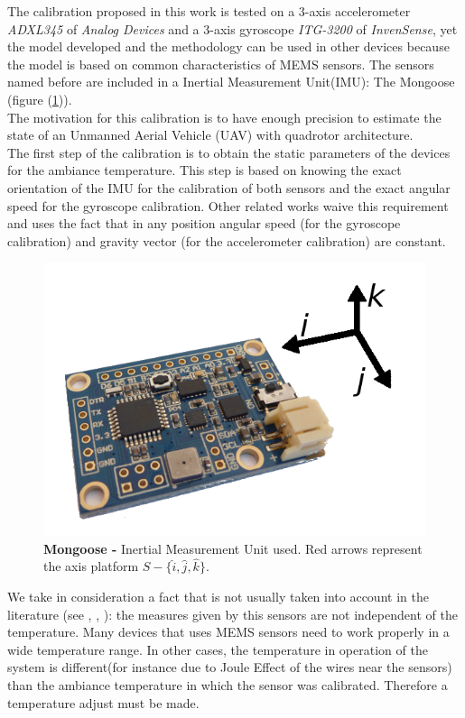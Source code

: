 \documentclass[conference]{IEEEtran}
\newcommand{\refp}[1]{(\ref{#1})}
\begin{document}
The calibration proposed in this work is tested on a 3-axis accelerometer \emph{ADXL345} of \emph{Analog Devices} and a 3-axis gyroscope \emph{ITG-3200} of \emph{InvenSense}, yet the model developed and the methodology can be used in other devices because the model is based on common characteristics of MEMS sensors. The sensors named before are included in a Inertial Measurement Unit(IMU): The Mongoose (figure \refp{fig:mongoose}). \\

The motivation for this calibration is to have enough precision to estimate the state of an Unmanned Aerial Vehicle (UAV) with quadrotor architecture.\\

The first step of the calibration is to obtain the static parameters of the devices for the ambiance temperature. This step is based on knowing the exact orientation of the IMU for the calibration of both sensors and the exact angular speed for the gyroscope calibration. Other related works waive this requirement\cite{bib:calib_imu, bib:kalman} and uses the fact that in any position angular speed (for the gyroscope calibration) and gravity vector (for the accelerometer calibration) are constant.\\

\begin{figure}[h]
	\centering
	\includegraphics[width=.6\columnwidth]{./pics_paper/mongoose.png}
	\caption{\textbf{Mongoose -} Inertial Measurement Unit used. Red arrows represent the axis platform $S - \{\hat{i}, \hat{j}, \hat{k} \}$. }
	\label{fig:mongoose}
\end{figure}

We take in consideration a fact that is not usually taken into account in the literature (see \cite{bib:calib_imu}, \cite{bib:kalman}, \cite{bib:calib_imu_dos}): the measures given by this sensors are not independent of the temperature. Many devices that uses MEMS sensors need to work properly in a wide temperature range. In other cases, the temperature in operation of the system is different(for instance due to Joule Effect of the wires near the sensors) than the ambiance temperature in which the sensor was calibrated. Therefore a temperature adjust must be made.
   
\end{document}

